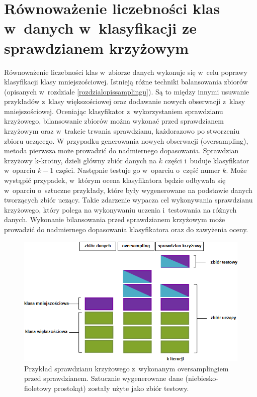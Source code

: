 \section{Równoważenie liczebności klas w~danych w~klasyfikacji ze sprawdzianem krzyżowym}
\label{rozdzialbalansowanie}
Równoważenie liczebności klas w~zbiorze danych wykonuje się w~celu poprawy klasyfikacji klasy mniejszościowej. Istnieją różne techniki balansowania zbiorów (opisanych w~rozdziale \ref{rozdzialopissamplingu}). Są to między innymi usuwanie przykładów z~klasy większościowej oraz dodawanie nowych obserwacji z~klasy mniejszościowej. Oceniając klasyfikator z~wykorzystaniem sprawdzianu krzyżowego, bilansowanie zbiorów można wykonać przed sprawdzianem krzyżowym oraz w~trakcie trwania sprawdzianu, każdorazowo po stworzeniu zbioru uczącego. W przypadku generowania nowych obserwacji (oversampling), metoda pierwsza może prowadzić do nadmiernego dopasowania. Sprawdzian krzyżowy k-krotny, dzieli główny zbiór danych na $k$ części i~buduje klasyfikator w~oparciu $k-1$ części. Następnie testuje go w~oparciu o~część numer $k$. Może wystąpić przypadek, w~którym ocena klasyfikatora będzie odbywała się w~oparciu o~sztuczne przykłady, które były wygenerowane na podstawie danych tworzących zbiór uczący. Takie zdarzenie wypacza cel wykonywania sprawdzianu krzyżowego, który polega na wykonywaniu uczenia i~testowania na różnych danych. Wykonanie bilansowania przed sprawdzianem krzyżowym może prowadzić do nadmiernego dopasowania klasyfikatora oraz do zawyżenia oceny. 
\begin{figure}[H]
	\centering
	\includegraphics[width=\textwidth]{./images/oversampling.png}
	\caption[Sprawdzian krzyżowy z~oversamplingiem]{Przykład sprawdzianu krzyżowego z~wykonanym oversamplingiem przed sprawdzianem. Sztucznie wygenerowane dane (niebiesko-fioletowy prostokąt) zostały użyte jako zbiór testowy.}
	\label{fig:oversampling_wrong}
\end{figure}
